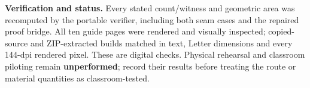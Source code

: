 \documentclass[letterpaper,11pt]{article}
\begin{document}
\textbf{Verification and status.} Every stated count/witness and geometric area was recomputed by the portable verifier, including both seam cases and the repaired proof bridge. All ten guide pages were rendered and visually inspected; copied-source and ZIP-extracted builds matched in text, Letter dimensions and every 144-dpi rendered pixel. These are digital checks. Physical rehearsal and classroom piloting remain \textbf{unperformed}; record their results before treating the route or material quantities as classroom-tested.
\end{document}
